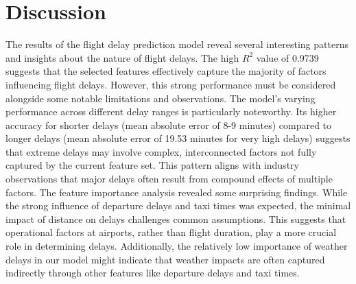 \section{Discussion}
The results of the flight delay prediction model reveal several interesting patterns and insights about the nature of flight delays. 
The high $R^2$ value of 0.9739 suggests that the selected features effectively capture the majority of factors influencing flight delays. 
However, this strong performance must be considered alongside some notable limitations and observations.
The model's varying performance across different delay ranges is particularly noteworthy. 
Its higher accuracy for shorter delays (mean absolute error of 8-9 minutes) compared to longer delays (mean absolute error of 19.53 minutes for very high delays) suggests that extreme delays may involve complex, interconnected factors not fully captured by the current feature set.
This pattern aligns with industry observations that major delays often result from compound effects of multiple factors.
The feature importance analysis revealed some surprising findings. 
While the strong influence of departure delays and taxi times was expected, the minimal impact of distance on delays challenges common assumptions. 
This suggests that operational factors at airports, rather than flight duration, play a more crucial role in determining delays. 
Additionally, the relatively low importance of weather delays in our model might indicate that weather impacts are often captured indirectly through other features like departure delays and taxi times.
